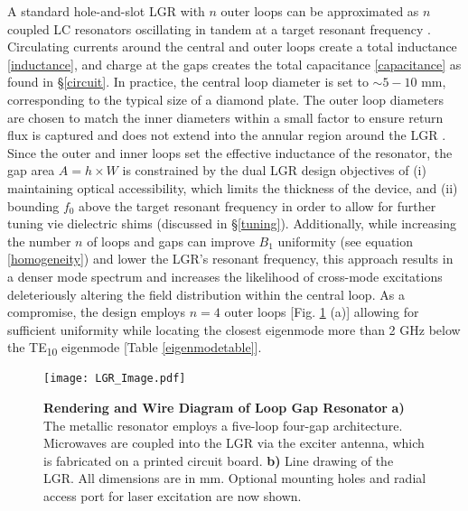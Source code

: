 A standard hole-and-slot LGR with $n$ outer loops can be approximated as $n$ coupled LC resonators oscillating in tandem at a target resonant frequency \cite{wood1984loop}. Circulating currents around the central and outer loops create a total inductance \ref{inductance}, and charge at the gaps creates the total capacitance \ref{capacitance} as found in \S \ref{circuit}. In practice, the central loop diameter is set to $\sim 5-10 $ mm, corresponding to the typical size of a diamond plate. The outer loop diameters are chosen to match the inner diameters within a small factor to ensure return flux is captured and does not extend into the annular region around the LGR \cite{mehdizadeh1983Loop}. Since the outer and inner loops set the effective inductance of the resonator, the gap area $A = h \times W$ is constrained by the dual LGR design objectives of (i) maintaining optical accessibility, which limits the thickness of the device, and (ii) bounding $f_0$ above the target resonant frequency in order to allow for further tuning vie dielectric shims (discussed in \S \ref{tuning}). Additionally, while increasing the number $n$ of loops and gaps can improve $B_1$ uniformity (see equation \ref{homogeneity}) and lower the LGR's resonant frequency, this approach results in a denser mode spectrum \cite{froncisz1982loop} and increases the likelihood of cross-mode excitations deleteriously altering the field distribution within the central loop. As a compromise, the design employs $n=4$ outer loops [Fig. \ref{LGR_drawing} (a)] allowing for sufficient uniformity while locating the closest eigenmode more than 2 GHz below the TE\textsubscript{10} eigenmode [Table \ref{eigenmodetable}].  

\begin{figure}[t!]
\centering
\texttt{[image: LGR\_Image.pdf]}  
\caption{\textbf{Rendering and Wire Diagram of Loop Gap Resonator} \textbf{a)} The metallic resonator employs a five-loop four-gap architecture. Microwaves are coupled into the LGR via the exciter antenna, which is fabricated on a printed circuit board. \textbf{b)} Line drawing of the LGR. All dimensions are in mm. Optional mounting holes and radial access port for laser excitation are now shown.}
\label{LGR_drawing}
\end{figure}

